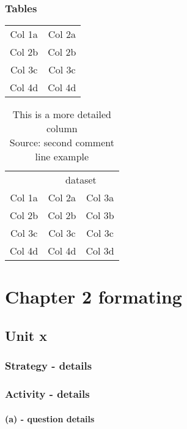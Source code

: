 \documentclass[fleqn]{report}
\begin{document}
\subsection{Tables}

\begin{center}
\begin{tabular}{c c}
Col 1a & Col 2a \\
Col 2b & Col 2b \\
Col 3c & Col 3c \\
Col 4d & Col 4d \\
\end{tabular}
\end{center}

\begin{table}

\begin{center}
\begin{tabular}{|c|c|c|}
\hline
\multicolumn{1}{|c|}{} & \multicolumn{2}{c|}{dataset} \\
					\cline{2-3}
Col 1a & Col 2a & Col 3a \\
\hline
Col 2b & Col 2b & Col 3b \\
\hline
Col 3c & Col 3c & Col 3c \\
\hline
Col 4d & Col 4d & Col 3d \\
\hline
\end{tabular}
\end{center}
\label{table2}
\caption{This is a more detailed column \\  Source: second comment line example}
\end{table}

\chapter{Chapter 2 formating}
\section{Unit x}

\subsection{Strategy - details}

\subsection{Activity - details}

\subsubsection{(a) - question details}
\end{document}
